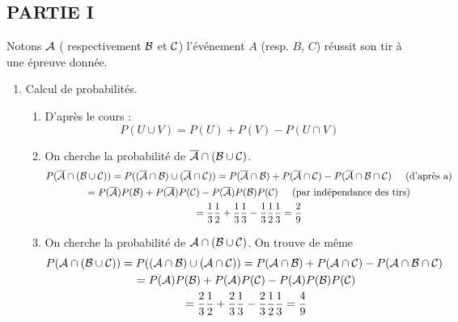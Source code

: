 \subsection*{PARTIE I}
Notons  $\cal A$ ( respectivement $\cal B$ et $\cal C$) l'événement $A$ (resp. $B$, $C$) réussit son tir à une épreuve donnée.
\begin{enumerate}
\item Calcul de probabilités.
\begin{enumerate}
\item  D'après le cours : $$P(U\cup V)=P(U)+P(V)-P(U\cap V)$$
 \item  On cherche la probabilité de $\overline{{\cal A}}\cap({\cal B}\cup {\cal C)}$.
 \begin{multline*}
 P(\overline{{\cal A}}\cap({\cal B}\cup {\cal C)}) 
  = P((\overline{{\cal A}}\cap{\cal B})\cup (\overline{{\cal A}}\cap{\cal C)})
  = P(\overline{{\cal A}}\cap{\cal B})+P(\overline{{\cal A}}\cap{\cal C}) -P(\overline{{\cal A}}\cap{\cal B}\cap{\cal C}) \hspace{0.5cm}\text{(d'après a)}\\
  = P(\overline{{\cal A}})P({\cal B}) +P(\overline{{\cal A}})P({\cal C}) - P(\overline{{\cal A}})P({\cal B})P({\cal C})
 \hspace{0.5cm}\text{(par indépendance des tirs)}\\
 = \frac 13\frac12+\frac13\frac13-\frac13\frac12\frac13 
 = \frac29
 \end{multline*}
 
\item On cherche la probabilité de ${\cal A}\cap({\cal B}\cup {\cal C)}$. On trouve de même
 \begin{multline*}
 P({{\cal A}}\cap({\cal B}\cup {\cal C)})
  = P(({{\cal A}}\cap{\cal B})\cup ({{\cal A}}\cap{\cal C)})
  = P({{\cal A}}\cap{\cal B})+P({{\cal A}}\cap{\cal C}) -P({{\cal A}}\cap{\cal B}\cap{\cal C})\ \\
  = P({{\cal A}})P({\cal B}) +P({{\cal A}})P({\cal C}) - P({{\cal A}})P({\cal B})P({\cal C})\\ 
  = \frac 23\frac12+\frac23\frac13-\frac23\frac12\frac13 
  = \frac49
 \end{multline*}
\end{enumerate}


\end{enumerate}
